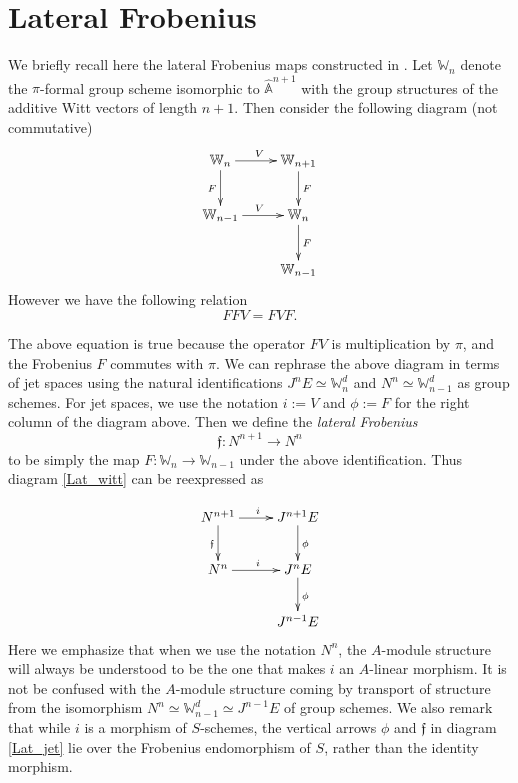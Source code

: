 \documentclass{amsart}
\numberwithin {equation}{section}
\begin{document}
\section{Lateral Frobenius}
We briefly recall here the lateral Frobenius maps constructed in \cite{BS b}.
Let $\mathbb{W}_{n}$ denote the $\pi$-formal group scheme isomorphic to $\hat{\mathbb{A}}^{n+1}$ with the group structures of the additive Witt vectors of length $n+1$.
Then consider the following diagram (not commutative)
\begin{equation}\label{Lat_witt}
{
\xymatrix{
\mathbb{W}_{n}\ar[d]_{F} \ar[r]^{V} &\mathbb{W}_{n+1}\ar[d]^{F}  \\
\mathbb{W}_{n-1} \ar[r]^{V} &\mathbb{W}_{n}\ar[d]^{F}\\
&\mathbb{W}_{n-1} }}
\end{equation}
However we have the following relation  
\begin{equation}\label{Fr_var}
FFV=FVF.
\end{equation}


The above equation is true because the operator $FV$ is multiplication by $\pi$, and the Frobenius $F$ commutes with $\pi$. We can rephrase the above diagram in terms of jet spaces using the natural identifications $J^{n}E\simeq \mathbb{W}_{n}^{d}$ and $N^{n}\simeq \mathbb{W}_{n-1}^{d}$ as group schemes. For jet spaces, we use the notation $i := V$ and $\phi := F$ for the right column of the diagram above. Then we define the \emph{lateral Frobenius}
\begin{equation*}
\mathfrak{f}:N^{n+1}\rightarrow N^{n}
\end{equation*}
to be simply the map $F:\mathbb{W}_{n}\rightarrow \mathbb{W}_{n-1}$ under the above identification. Thus diagram \eqref{Lat_witt} can be reexpressed as



\begin{equation}\label{Lat_jet}
{
\xymatrix{
N^{n+1}\ar[d]_{\mathfrak{f}} \ar[r]^{i} &J^{n+1}E\ar[d]^{\phi}  \\
N^{n} \ar[r]^{i} &J^{n}E\ar[d]^{\phi}\\
&J^{n-1}E }}
\end{equation} 
Here we emphasize that when we use the notation $N^{n}$, the $A$-module structure will always be understood to be the one that makes $i$ an $A$-linear morphism. It is not be confused with the $A$-module structure coming by transport of structure from the isomorphism $N^{n}\simeq \mathbb{W}_{n-1}^{d} \simeq
 J^{n-1}E$ of group schemes.
We also remark that while $i$ is a morphism of $S$-schemes, the vertical arrows $\phi$  and $\mathfrak{f}$ in diagram \eqref{Lat_jet} lie over the Frobenius endomorphism  of $S$, rather than the identity morphism.\medskip
\end{document}
